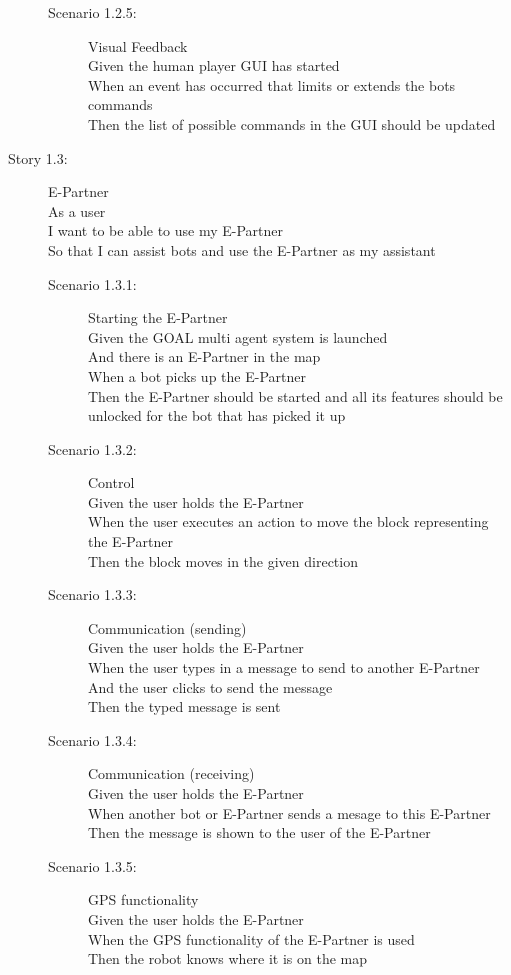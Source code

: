 \begin{description}
\begin{description}
    \item[Scenario 1.2.5:] Visual Feedback\\
    Given the human player GUI has started\\
    When an event has occurred that limits or extends the bots commands\\
    Then the list of possible commands in the GUI should be updated
  \end{description}
  \item[Story 1.3:] E-Partner\\
  As a user\\
  I want to be able to use my E-Partner\\
  So that I can assist bots and use the E-Partner as my assistant

  \begin{description}
    \item[Scenario 1.3.1:] Starting the E-Partner\\
    Given the GOAL multi agent system is launched\\
    And there is an E-Partner in the map\\
    When a bot picks up the E-Partner\\
    Then the E-Partner should be started and all its features should be unlocked for the bot that has picked it up
    
    \item[Scenario 1.3.2:] Control\\
    Given the user holds the E-Partner\\
    When the user executes an action to move the block representing the E-Partner\\
    Then the block moves in the given direction
    
    \item[Scenario 1.3.3:] Communication (sending)\\
    Given the user holds the E-Partner\\
    When the user types in a message to send to another E-Partner\\
    And the user clicks to send the message\\
    Then the typed message is sent
    
    \item[Scenario 1.3.4:] Communication (receiving)\\
    Given the user holds the E-Partner\\
    When another bot or E-Partner sends a mesage to this E-Partner\\
    Then the message is shown to the user of the E-Partner
    
    \item[Scenario 1.3.5:] GPS functionality\\
    Given the user holds the E-Partner\\
    When the GPS functionality of the E-Partner is used\\
    Then the robot knows where it is on the map
  \end{description}
\end{description}

